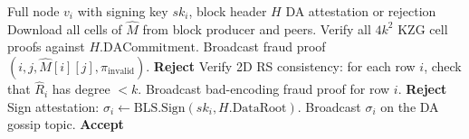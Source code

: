 \documentclass[11pt,a4paper]{article}
\theoremstyle{plain}
\theoremstyle{definition}
\theoremstyle{remark}
\begin{document}
\begin{algorithm}[H]
\caption{DA Oracle Attestation Protocol}
\label{alg:da-oracle}
\begin{algorithmic}[1]
\Require Full node $v_i$ with signing key $sk_i$, block header $H$
\Ensure DA attestation or rejection
\State Download all cells of $\hat{M}$ from block producer and peers.
\State Verify all $4k^2$ KZG cell proofs against $H.\text{DACommitment}$.
    \State Broadcast fraud proof $(i, j, \hat{M}[i][j], \pi_{\text{invalid}})$.
    \State \Return \textbf{Reject}
\EndIf
\State Verify 2D RS consistency: for each row $i$, check that $\hat{R}_i$ has degree $< k$.
    \State Broadcast bad-encoding fraud proof for row $i$.
    \State \Return \textbf{Reject}
\EndIf
\State Sign attestation: $\sigma_i \gets \text{BLS.Sign}(sk_i, H.\text{DataRoot})$.
\State Broadcast $\sigma_i$ on the DA gossip topic.
\State \Return \textbf{Accept}
\end{algorithmic}
\end{algorithm}
\end{document}
